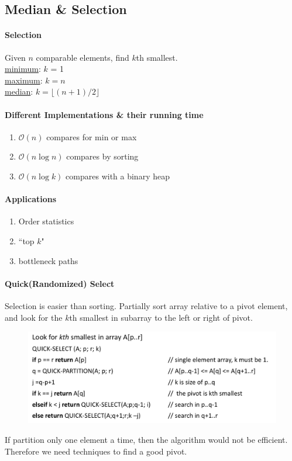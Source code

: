 \documentclass[11pt]{article}
\newcommand{\under}[1]{\underline{#1}}
\begin{document}
\subsection{Median \& Selection}
\paragraph{Selection}
Given $n$ comparable elements, find $k$th smallest. \\
\under{minimum}: $k$ = 1 \\
\under{maximum}: $k=n$ \\
\under{median}: $k = \lfloor (n+1) / 2\rfloor$

\paragraph{Different Implementations \& their running time}
\begin{enumerate}
	\item $\mathcal{O}(n)$ compares for min or max
	\item $\mathcal{O}(n \log n)$ compares by sorting
	\item $\mathcal{O}(n \log k)$ compares with a binary heap
\end{enumerate}

\paragraph{Applications}
\begin{enumerate}
	\item Order statistics
	\item ``top $k$"
	\item bottleneck paths
\end{enumerate}

\paragraph{Quick(Randomized) Select}
Selection is easier than sorting.
Partially sort array relative to a pivot element, and look for the $k$th smallest in subarray to the left or right of pivot.
\begin{figure}[h]
	\centering
	\includegraphics[scale=0.6]{p5}
\end{figure}
If partition only one element a time, then the algorithm would not be efficient. Therefore we need techniques to find a good pivot.
\end{document}
